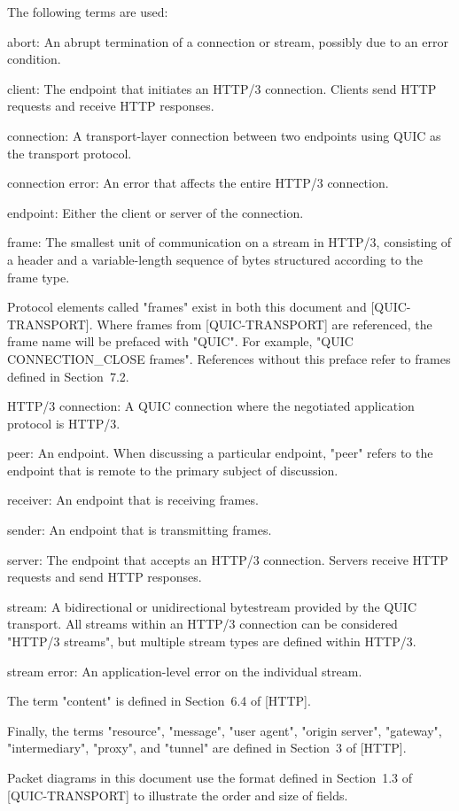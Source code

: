 \documentclass{article}
\begin{document}
The following terms are used:

abort:  An abrupt termination of a connection or stream, possibly due to an error condition.

client:  The endpoint that initiates an HTTP/3 connection.  Clients send HTTP requests and receive HTTP responses.

connection:  A transport-layer connection between two endpoints using QUIC as the transport protocol.

connection error:  An error that affects the entire HTTP/3 connection.

endpoint:  Either the client or server of the connection.

frame:  The smallest unit of communication on a stream in HTTP/3, consisting of a header and a variable-length sequence of bytes structured according to the frame type.

Protocol elements called "frames" exist in both this document and [QUIC-TRANSPORT].  Where frames from [QUIC-TRANSPORT] are referenced, the frame name will be prefaced with "QUIC".  For example, "QUIC CONNECTION\_CLOSE frames".  References without this preface refer to frames defined in Section~7.2.

HTTP/3 connection:  A QUIC connection where the negotiated application protocol is HTTP/3.

peer:  An endpoint.  When discussing a particular endpoint, "peer" refers to the endpoint that is remote to the primary subject of discussion.

receiver:  An endpoint that is receiving frames.

sender:  An endpoint that is transmitting frames.

server:  The endpoint that accepts an HTTP/3 connection.  Servers receive HTTP requests and send HTTP responses.

stream:  A bidirectional or unidirectional bytestream provided by the QUIC transport.  All streams within an HTTP/3 connection can be considered "HTTP/3 streams", but multiple stream types are defined within HTTP/3.

stream error:  An application-level error on the individual stream.

The term "content" is defined in Section~6.4 of [HTTP].

Finally, the terms "resource", "message", "user agent", "origin server", "gateway", "intermediary", "proxy", and "tunnel" are defined in Section~3 of [HTTP].

Packet diagrams in this document use the format defined in Section~1.3 of [QUIC-TRANSPORT] to illustrate the order and size of fields.
\end{document}
